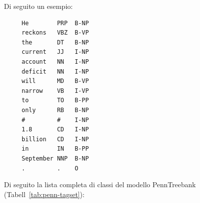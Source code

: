 Di seguito un esempio:

\begin{center}
  \begin{minipage}{5cm}
    \begin{verbatim}
     He        PRP  B-NP
     reckons   VBZ  B-VP
     the       DT   B-NP
     current   JJ   I-NP
     account   NN   I-NP
     deficit   NN   I-NP
     will      MD   B-VP
     narrow    VB   I-VP
     to        TO   B-PP
     only      RB   B-NP
     #         #    I-NP
     1.8       CD   I-NP
     billion   CD   I-NP
     in        IN   B-PP
     September NNP  B-NP
     .         .    O
    \end{verbatim}
  \end{minipage}
\end{center}

Di seguito la lista completa di classi del modello PennTreebank (Tabell~\ref{tab:penn-tagset}):

